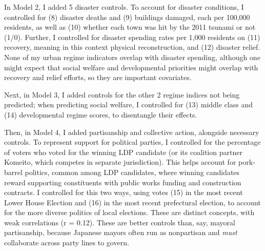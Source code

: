 \documentclass[preprint, 3p,
authoryear]{elsarticle} %
\begin{document}
In Model 2, I added 5 disaster controls. To account for disaster
conditions, I controlled for (8) disaster deaths and (9) buildings
damaged, each per 100,000 residents, as well as (10) whether each town
was hit by the 2011 tsunami or not (1/0). Further, I controlled for
disaster spending rates per 1,000 residents on (11) recovery, meaning in
this context physical reconstruction, and (12) disaster relief. None of
my urban regime indicators overlap with disaster spending, although one
might expect that social welfare and developmental priorities might
overlap with recovery and relief efforts, so they are important
covariates.

Next, in Model 3, I added controls for the other 2 regime indices not
being predicted; when predicting social welfare, I controlled for (13)
middle class and (14) developmental regime scores, to disentangle their
effects.

Then, in Model 4, I added partisanship and collective action, alongside
necessary controls. To represent support for political parties, I
controlled for the percentage of voters who voted for the winning LDP
candidate (or its coalition partner Komeito, which competes in separate
jurisdiction). This helps account for pork-barrel politics, common among
LDP candidates, where winning candidates reward supporting constituents
with public works funding and construction contracts. I controlled for
this two ways, using votes (15) in the most recent Lower House Election
and (16) in the most recent prefectural election, to account for the
more diverse politics of local elections. These are distinct concepts,
with weak correlations (r = 0.12). These are better controls than, say,
mayoral partisanship, because Japanese mayors often run as nonpartisan
and \emph{must} collaborate across party lines to govern.
\end{document}
